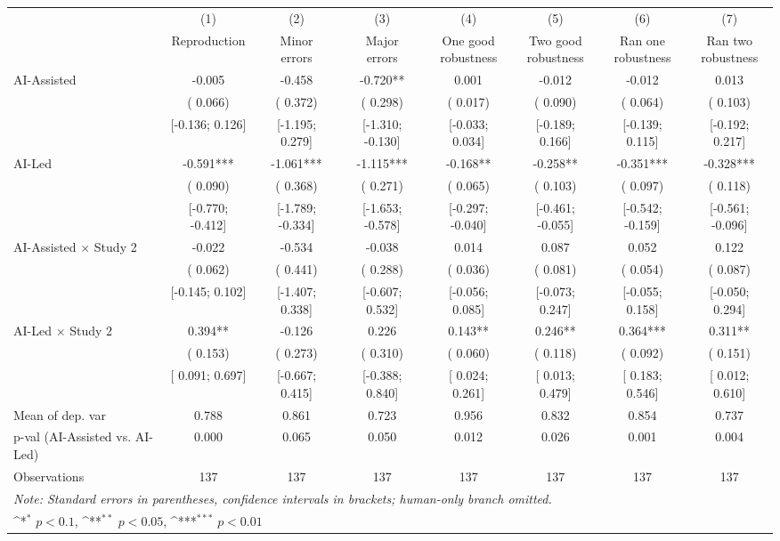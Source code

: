 \def\sym#1{\ifmmode^{#1}\else\(^{#1}\)\fi}
\begin{tabular}{l*{7}{c}}
\hline\hline
& (1) & (2) & (3) & (4) & (5) & (6) & (7)\\
                    &
Reproduction   &\shortstack[c]{Minor\\errors}   &\shortstack[c]{Major\\errors}   &\shortstack[c]{One good\\robustness}   &\shortstack[c]{Two good\\robustness}   &\shortstack[c]{Ran one\\robustness}   &\shortstack[c]{Ran two\\robustness}
   \\
\hline
AI-Assisted & -0.005 & -0.458 & -0.720** &  0.001 & -0.012 & -0.012 &  0.013 \\
 & ( 0.066) & ( 0.372) & ( 0.298) & ( 0.017) & ( 0.090) & ( 0.064) & ( 0.103) \\
 & [-0.136;  0.126] & [-1.195;  0.279] & [-1.310; -0.130] & [-0.033;  0.034] & [-0.189;  0.166] & [-0.139;  0.115] & [-0.192;  0.217] \\
AI-Led & -0.591*** & -1.061*** & -1.115*** & -0.168** & -0.258** & -0.351*** & -0.328*** \\
 & ( 0.090) & ( 0.368) & ( 0.271) & ( 0.065) & ( 0.103) & ( 0.097) & ( 0.118) \\
 & [-0.770; -0.412] & [-1.789; -0.334] & [-1.653; -0.578] & [-0.297; -0.040] & [-0.461; -0.055] & [-0.542; -0.159] & [-0.561; -0.096] \\
AI-Assisted $\times$ Study 2 & -0.022 & -0.534 & -0.038 &  0.014 &  0.087 &  0.052 &  0.122 \\
 & ( 0.062) & ( 0.441) & ( 0.288) & ( 0.036) & ( 0.081) & ( 0.054) & ( 0.087) \\
 & [-0.145;  0.102] & [-1.407;  0.338] & [-0.607;  0.532] & [-0.056;  0.085] & [-0.073;  0.247] & [-0.055;  0.158] & [-0.050;  0.294] \\
AI-Led $\times$ Study 2 &  0.394** & -0.126 &  0.226 &  0.143** &  0.246** &  0.364*** &  0.311** \\
 & ( 0.153) & ( 0.273) & ( 0.310) & ( 0.060) & ( 0.118) & ( 0.092) & ( 0.151) \\
 & [ 0.091;  0.697] & [-0.667;  0.415] & [-0.388;  0.840] & [ 0.024;  0.261] & [ 0.013;  0.479] & [ 0.183;  0.546] & [ 0.012;  0.610] \\
\hline
Mean of dep. var &  0.788 &  0.861 &  0.723 &  0.956 &  0.832 &  0.854 &  0.737 \\
p-val (AI-Assisted vs. AI-Led) &  0.000 &  0.065 &  0.050 &  0.012 &  0.026 &  0.001 &  0.004 \\
Observations & 137 & 137 & 137 & 137 & 137 & 137 & 137 \\
\hline\hline
\multicolumn{8}{l}{\it{Note:} Standard errors in parentheses, confidence intervals in brackets; human-only branch omitted.}\\
\multicolumn{8}{l}{\sym{*} \(p<0.1\), \sym{**} \(p<0.05\), \sym{***} \(p<0.01\)}\\
\end{tabular}
